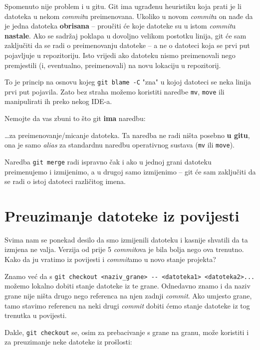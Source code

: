 Spomenuto nije problem i u gitu.
Git ima ugrađenu heuristiku koja prati je li datoteka u nekom \emph{commit}u preimenovana.
Ukoliko u novom \emph{commit}u on nađe da je jedna datoteka \textbf{obrisana} -- proučiti će koje datoteke su u istom \emph{commit}u \textbf{nastale}. 
Ako se sadržaj poklapa u dovoljno velikom postotku linija, git će sam zaključiti da se radi o preimenovanju datoteke -- a ne o datoteci koja se prvi put pojavljuje u repozitoriju.
Isto vrijedi ako datoteku nismo preimenovali nego premjestili (i, eventualno, preimenovali) na novu lokaciju u repozitorij.

To je princip na osnovu kojeg \verb+git blame -C+ "zna" u kojoj datoteci se neka linija prvi put pojavila.
Zato bez straha možemo koristiti naredbe \verb+mv+, \verb+move+ ili manipulirati ih preko nekog IDE-a.

Nemojte da vas zbuni to što git \textbf{ima} naredbu:


\dots{}za preimenovanje/micanje datoteka.
Ta naredba ne radi ništa posebno \textbf{u gitu}, ona je samo \emph{alias} za standardnu naredbu operativnog sustava (\verb+mv+ ili \verb+move+).

Naredba \verb+git merge+ radi ispravno čak i ako u jednoj grani datoteku preimenujemo i izmijenimo, a u drugoj samo izmijenimo -- git će sam zaključiti da se radi o istoj datoteci različitog imena.

\section*{Preuzimanje datoteke iz povijesti}

Svima nam se ponekad desilo da smo izmijenili datoteku i kasnije shvatili da ta izmjena ne valja. 
Verzija od prije 5 \emph{commit}ova je bila bolja nego ova trenutno.
Kako da ju vratimo iz povijesti i \emph{commit}amo u novo stanje projekta?

Znamo već da s \verb+git checkout <naziv_grane> -- <datoteka1> <datoteka2>...+ možemo lokalno dobiti stanje datoteke iz te grane.
Odnedavno znamo i da naziv grane nije ništa drugo nego referenca na njen zadnji \emph{commit}.
Ako umjesto grane, tamo stavimo referencu na neki drugi \emph{commit} dobiti ćemo stanje datoteke iz tog trenutka u povijesti.

Dakle, \verb+git checkout+ se, osim za prebacivanje s grane na granu, može koristiti i za preuzimanje neke datoteke iz prošlosti:

